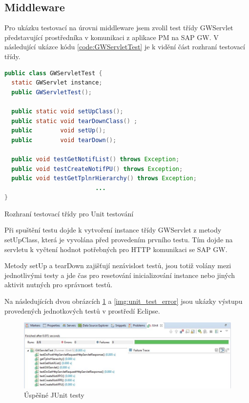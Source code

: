 \documentclass[thesis=M,czech]{FITthesis}[2012/06/26]
\begin{document}
\subsection{Middleware}
Pro ukázku testovací na úrovni middleware jsem zvolil test třídy GWServlet představující prostředníka v komunikaci z aplikace PM na SAP GW.  V následující ukázce kódu \ref{code:GWServletTest} je k vidění část rozhraní testovací třídy. 
\begin{algorithm}[H]
	\begin{lstlisting}[language=java]   
public class GWServletTest {
  static GWServlet instance;	
  public GWServletTest();
	
  public static void setUpClass();
  public static void tearDownClass() ;
  public        void setUp();
  public        void tearDown();
	
  public void testGetNotifList() throws Exception;
  public void testCreateNotifPU() throws Exception;
  public void testGetTplnrHierarchy() throws Exception;
                          ...
}
	\end{lstlisting}
	\caption{Rozhraní testovací třídy pro Unit testování}	
	\label{code:GWServletTest}
\end{algorithm}

Při spuštění testu dojde k vytvoření instance třídy GWServlet z metody setUpClass, která je vyvolána před provedením prvního testu. Tím dojde na servletu k vyčtení hodnot potřebných pro HTTP komunikaci se SAP GW.

Metody setUp a tearDown zajišťují nezávislost testů, jsou totiž volány mezi jednotlivými testy a jde čas pro resetování inicializování instance nebo jiných aktivit nutných pro správnost testů. 

Na následujících dvou obrázcích \ref{img:unit_test_success} a \ref{img:unit_test_error} jsou ukázky výstupu provedených jednotkových testů v prostředí Eclipse.	

\begin{figure}[H]
	\centering
	\includegraphics[width=1\textwidth]{images/unit_test_success}
	\caption{Úspěšné JUnit testy}
	\label{img:unit_test_success}
\end{figure}
\end{document}
